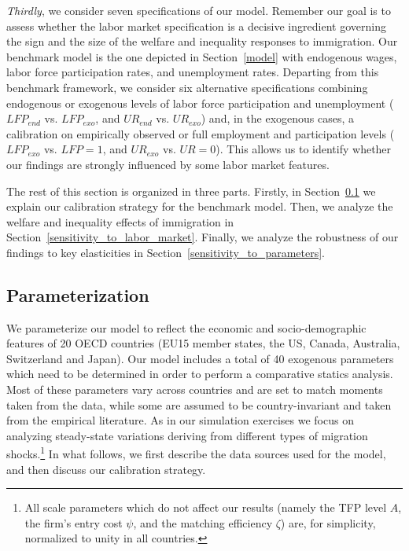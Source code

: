 \documentclass[a4paper,12pt]{article}
\begin{document}
\emph{Thirdly}, we consider seven specifications of our model. Remember our
goal is to assess whether the labor market specification is a decisive
ingredient governing the sign and the size of the welfare and inequality
responses to immigration. Our benchmark model is the one depicted %
in Section~\ref{model} with endogenous wages, labor force participation rates, and unemployment
rates. Departing from this benchmark framework, we consider six alternative
specifications combining endogenous or exogenous levels of labor force
participation and unemployment ($LFP_{end}$ vs. $LFP_{exo}$, and $UR_{end}$
vs. $UR_{exo}$) and, in the exogenous cases, a calibration on empirically
observed or full employment and participation levels ($LFP_{exo}$ vs. $LFP=1$, and $UR_{exo}$
vs. $UR=0$). This allows us to identify whether our findings are strongly
influenced by some labor market features.

The rest of this section is organized in three parts. Firstly, in Section~\ref{parameterization} we explain our calibration strategy for the benchmark
model. Then, we analyze the welfare and inequality effects of immigration in Section~\ref{sensitivity_to_labor_market}. Finally, we analyze the robustness of our findings to key elasticities in Section~\ref{sensitivity_to_parameters}.

\subsection{Parameterization} \label{parameterization}
We parameterize our model to reflect the economic and socio-demographic features of 20 OECD countries (EU15 member states, the US, Canada, Australia, Switzerland and Japan). 
Our model includes a total of 40 exogenous parameters which need to be determined in order to perform a comparative statics analysis. Most of these parameters vary across countries and are set to match moments taken from the data, while some are assumed to be country-invariant and taken from the empirical literature. As in our simulation exercises we focus on analyzing steady-state variations deriving from different types of migration shocks.\footnote{All scale parameters which do not affect our results (namely the TFP level $A$, the firm's entry cost  $\psi$, and the matching efficiency $\zeta$) are, for simplicity, normalized to unity in all countries.} In what follows, we first describe the data sources used for the model, and then discuss our calibration strategy.
\end{document}
